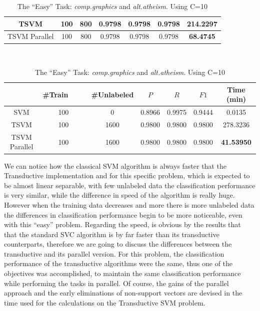 \begin{table}
\begin{longtable}
\begin{tabular}{|c|c|c|c|c|c||c|}
\hline 
TSVM & 100 & 800 & 0.9798 & 0.9798 & 0.9798 & 214.2297\tabularnewline
\hline 
TSVM Parallel & 100 & 800 & 0.9798 & 0.9798 & 0.9798 & 	\textbf{68.4745}\tabularnewline
\hline
\end{tabular}\\
\tabularnewline
\tabularnewline
\begin{tabular}{|c|c|c|c|c|c||c|}
\hline 
 & \#Train\ \ \ \ & \#Unlabeled & $P$  & $R$  & $F1$  & Time (min)\tabularnewline
\hline
\hline 
SVM & 100 & 0 & 0.8966 & 0.9975 & 0.9444 & 0.0135\tabularnewline
\hline 
TSVM & 100 & 1600 & 0.9800 & 0.9800 & 0.9800 & 278.3236%
\tabularnewline
\hline 
TSVM Parallel & 100 & 1600 & 0.9800 & 0.9800 & 0.9800 & \textbf{41.53950}\tabularnewline
\hline
\end{tabular}\tabularnewline
\end{longtable}

\caption{The {}``Easy'' Task:\emph{ comp.graphics} and \emph{alt.atheism}.
Using C=10 \label{tab:Easy-Task:comp.graphics-and} }

\end{table}

We can notice how the classical SVM algorithm is always faster that
the Transductive implementation and for this specific problem, which
is expected to be almost linear separable, with few unlabeled data
the classification performance is very similar, while the difference
in speed of the algorithm is really huge. However when the training
data decreases and more there is more unlabeled data the differences
in classification performance begin to be more noticeable, even with
this {}``easy'' problem. Regarding the speed, is obvious by the
results that that the standard SVC algorithm is by far faster than
its transductive counterparts, therefore we are going to discuss the
differences between the transductive and its parallel version. For
this problem, the classification performance of the transductive algorithms
were the same, thus one of the objectives was accomplished, to maintain
the same classification performance while performing the tasks in
parallel. Of course, the gains of the parallel approach and the early
eliminations of non-support vectors are devised in the time used for
the calculations on the Transductive SVM problem.

